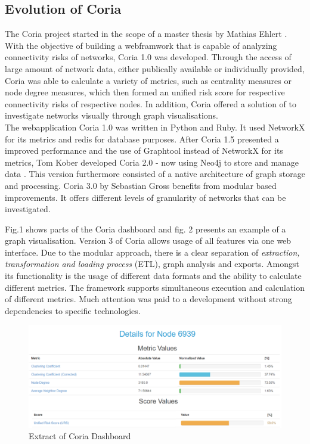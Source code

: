 \documentclass[conference, 11pt]{IEEEtran}
\begin{document}
\subsection{Evolution of Coria}
The Coria project started in the scope of a master thesis by Mathias Ehlert \cite{Ehlert}. With the objective of building a webframwork that is capable of analyzing connectivity risks of networks, Coria 1.0 was developed. Through the access of large amount of network data, either publically available or individually provided, Coria was able to calculate a variety of metrics, such as  
centrality measures or node degree measures, which then formed an unified risk score for respective connectivity risks of respective nodes. In addition, Coria offered a solution of to investigate networks visually through graph visualisations. \\ \linebreak 
 The webapplication Coria 1.0 was written in Python and Ruby. It used NetworkX for its metrics and redis for database purposes. After Coria 1.5 presented a improved performance and the use of Graphtool instead of NetworkX for its metrics, Tom Kober developed Coria 2.0 - now using Neo4j to store and manage data \cite{BA}. This version furthermore consisted of a native architecture of graph storage and processing\cite{Coria2}. Coria 3.0 by Sebastian Gross benefits from modular based improvements. It offers different levels of granularity of networks that can be investigated. \linebreak

Fig.1 shows parts of the Coria dashboard and fig. 2 presents an example of a graph visualisation. Version 3 of Coria allows usage of all features via one web interface. Due to the modular approach, there is a clear separation of \textit{extraction, transformation and loading process} (ETL), graph analysis and exports. Amongst its functionality is the usage of different data formats and the ability to calculate different metrics. The framework supports simultaneous execution and calculation of different metrics. Much attention was paid to a development without strong dependencies to specific technologies\cite{Coria3}. \\ \linebreak
 
 \begin{figure}[htbp]
\centerline{\includegraphics[scale=0.39]{Graphics/CoriaExtract.PNG}}
\caption{Extract of Coria Dashboard}
\label{fig}
\end{figure} 
\end{document}
